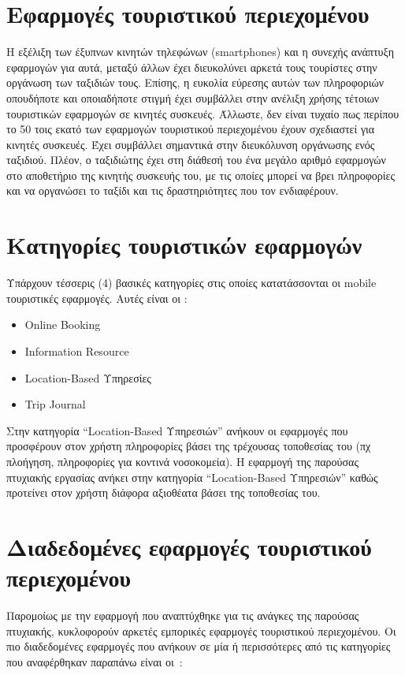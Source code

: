 \documentclass[oneside, 12pt]{book}
\begin{document}
\section{Εφαρμογές τουριστικού περιεχομένου}
Η εξέλιξη των έξυπνων κινητών τηλεφώνων (smartphones) και η συνεχής ανάπτυξη εφαρμογών για αυτά, 
μεταξύ άλλων έχει διευκολύνει αρκετά τους τουρίστες στην οργάνωση των ταξιδιών τους.
Επίσης, η ευκολία εύρεσης αυτών των πληροφοριών οπουδήποτε και οποιαδήποτε στιγμή έχει συμβάλλει στην ανέλιξη χρήσης τέτοιων τουριστικών εφαρμογών σε κινητές συσκευές.
Άλλωστε, δεν είναι τυχαίο πως περίπου το 50 τοις εκατό των εφαρμογών τουριστικού περιεχομένου έχουν σχεδιαστεί για κινητές συσκευές.
Έχει συμβάλλει σημαντικά στην διευκόλυνση οργάνωσης ενός ταξιδιού. 
Πλέον, ο ταξιδιώτης έχει στη διάθεσή του ένα μεγάλο αριθμό εφαρμογών στο αποθετήριο της κινητής συσκευής του, 
με τις οποίες μπορεί να βρει πληροφορίες και να οργανώσει το ταξίδι και τις δραστηριότητες που τον ενδιαφέρουν.

\section{Κατηγορίες τουριστικών εφαρμογών}
Υπάρχουν τέσσερις (4) βασικές κατηγορίες στις οποίες κατατάσσονται οι mobile τουριστικές εφαρμογές. 
Αυτές είναι οι :
\begin{itemize}
    \item Online Booking
    \item Information Resource
    \item Location-Based Υπηρεσίες
    \item Trip Journal
\end{itemize}
Στην κατηγορία ``Location-Based Υπηρεσιών'' ανήκουν οι εφαρμογές 
που προσφέρουν στον χρήστη πληροφορίες βάσει της τρέχουσας τοποθεσίας 
του (πχ πλοήγηση, πληροφορίες για κοντινά νοσοκομεία).
\cite{smirnov2014mobile}
Η εφαρμογή της παρούσας πτυχιακής εργασίας ανήκει στην κατηγορία 
``Location-Based Υπηρεσιών'' καθώς προτείνει στον χρήστη διάφορα 
αξιοθέατα βάσει της τοποθεσίας του.

\section{Διαδεδομένες εφαρμογές τουριστικού περιεχομένου}
Παρομοίως με την εφαρμογή που αναπτύχθηκε για τις ανάγκες της παρούσας πτυχιακής, 
κυκλοφορούν αρκετές εμπορικές εφαρμογές τουριστικού περιεχομένου.
Οι πιο διαδεδομένες εφαρμογές που ανήκουν σε μία ή περισσότερες από τις κατηγορίες που αναφέρθηκαν παραπάνω είναι οι~\cite{Oprahmag_TravelApps}:
\end{document}
